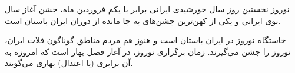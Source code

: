 نوروز نخستین روز سال خورشیدی ایرانی برابر با یکم فروردین ماه، جشن آغاز سال نوی ایرانی و یکی از کهن‌ترین جشن‌های به جا مانده از دوران ایران باستان است.

خاستگاه نوروز در ایران باستان است و هنوز هم مردم مناطق گوناگون فلات ایران، نوروز را جشن می‌گیرند. زمان برگزاری نوروز، در آغاز فصل بهار است که امروزه به آن برابری (یا اعتدال) بهاری می‌گویند.

